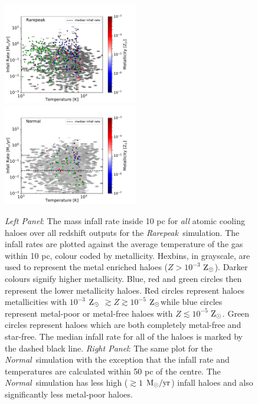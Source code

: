 \documentclass[graphics, twocolumn, usenatbib]{mn2e}
\newcommand{\msolaryrc} {$\rm{M_{\odot}/yr}$}
\newcommand{\zsolar} {$\rm{Z_{\odot}}~$}
\newcommand{\zsolarc} {$\rm{Z_{\odot}}$}
\newcommand{\rarepeak} {\textit{Rarepeak~}}
\newcommand{\normal} {\textit{Normal~}}
\begin{document}
\begin{figure}
\centering
\begin{minipage}{175mm}      \begin{center} 
\centerline{
\includegraphics[width=0.525\textwidth]{FIGURES/Rarepeak_MdotTZ.pdf}
\includegraphics[width=0.525\textwidth]{FIGURES/Normal_MdotTZ.pdf}}
\caption{\textit{Left Panel}: The mass infall rate inside 10 pc for \textit{all} atomic
  cooling haloes over all redshift outputs for the \rarepeak simulation. The infall rates are plotted
  against the average temperature of the gas within 10 pc, colour coded by metallicity. Hexbins, in
  grayscale, are used to represent the metal enriched haloes ($Z > 10^{-3}$ \zsolarc). Darker colours
  signify higher metallicity. Blue, red and green circles then represent the lower metallicity
  haloes. Red circles represent haloes metallicities with $10^{-3} $ \zsolar $\gtrsim
  Z \gtrsim 10^{-5}$ \zsolarc while blue circles represent metal-poor or metal-free
   haloes with $Z \lesssim 10^{-5}$ \zsolarc. Green circles represent haloes which are both
   completely metal-free and star-free. The median infall rate for all of the haloes is marked
   by the dashed black line. \textit{Right Panel}: The same plot for the \normal simulation with
   the exception that the infall rate and temperatures are calculated within 50 pc of the centre.
   The \normal simulation has less high ($ \gtrsim 1 $ \msolaryrc) infall haloes and also
   significantly less metal-poor haloes.} \label{Fig:Scatter}
\end{center} \end{minipage}

\end{figure}
\end{document}
